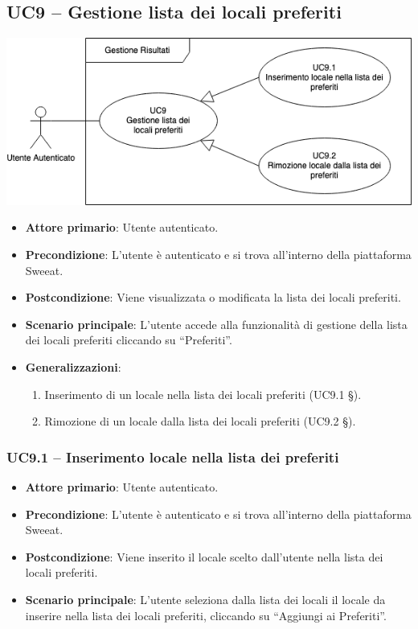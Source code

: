 \subsection{UC9 – Gestione lista dei locali preferiti}
\begin{center}
\includegraphics[scale=0.5]{UC_images/UC9.png} 
\end{center}
\begin{itemize}
    \item \textbf{Attore primario}: Utente autenticato.
    \item \textbf{Precondizione}: L'utente è autenticato e si trova all’interno della piattaforma Sweeat.
    \item \textbf{Postcondizione}: Viene visualizzata o modificata la lista dei locali preferiti.
    \item \textbf{Scenario principale}: L’utente accede alla funzionalità di gestione della lista dei locali preferiti cliccando su “Preferiti”.
    \item \textbf{Generalizzazioni}:
     \begin{enumerate}
        \item Inserimento di un locale nella lista dei locali preferiti (UC9.1 §).
        \item Rimozione di un locale dalla lista dei locali preferiti (UC9.2 §).
    \end{enumerate}
\end{itemize}
\subsubsection{UC9.1 – Inserimento locale nella lista dei preferiti}
\begin{itemize}
    \item \textbf{Attore primario}: Utente autenticato.
    \item \textbf{Precondizione}: L'utente è autenticato e si trova all’interno della piattaforma Sweeat.
    \item \textbf{Postcondizione}: Viene inserito il locale scelto dall’utente nella lista dei locali preferiti.
    \item \textbf{Scenario principale}: L’utente seleziona dalla lista dei locali il locale da inserire nella lista dei locali preferiti, cliccando su “Aggiungi ai Preferiti”.
\end{itemize}

